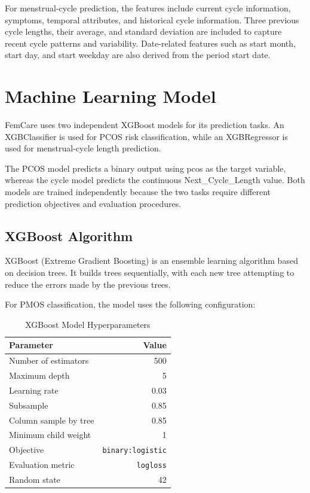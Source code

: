 For menstrual-cycle prediction, the features include current cycle information, symptoms, temporal attributes, and historical cycle information. Three previous cycle lengths, their average, and standard deviation are included to capture recent cycle patterns and variability. Date-related features such as start month, start day, and start weekday are also derived from the period start date.

\section{Machine Learning Model}
\label{sec:MLmodel}
FemCare uses two independent XGBoost models for its prediction tasks. An XGBClassifier is used for PCOS risk classification, while an XGBRegressor is used for menstrual-cycle length prediction.

The PCOS model predicts a binary output using pcos as the target variable, whereas the cycle model predicts the continuous Next\_Cycle\_Length value. Both models are trained independently because the two tasks require different prediction objectives and evaluation procedures.

\subsection{XGBoost Algorithm}
XGBoost (Extreme Gradient Boosting) is an ensemble learning algorithm based on decision trees. It builds trees sequentially, with each new tree attempting to reduce the errors made by the previous trees. \cite{ahmed2023}

For PMOS classification, the model uses the following configuration:

\renewcommand{\arraystretch}{1.4} %
\begin{table}[h]
\centering
\begin{tabular}{|l|r|}
\hline
\textbf{Parameter} & \textbf{Value} \\ \hline
Number of estimators & 500 \\ \hline
Maximum depth & 5 \\ \hline
Learning rate & 0.03 \\ \hline
Subsample & 0.85 \\ \hline
Column sample by tree & 0.85 \\ \hline
Minimum child weight & 1 \\ \hline
Objective & \texttt{binary:logistic} \\ \hline
Evaluation metric & \texttt{logloss} \\ \hline
Random state & 42 \\ \hline
\end{tabular}
\caption{XGBoost Model Hyperparameters}
\label{tab:hyperparameters}
\end{table}

